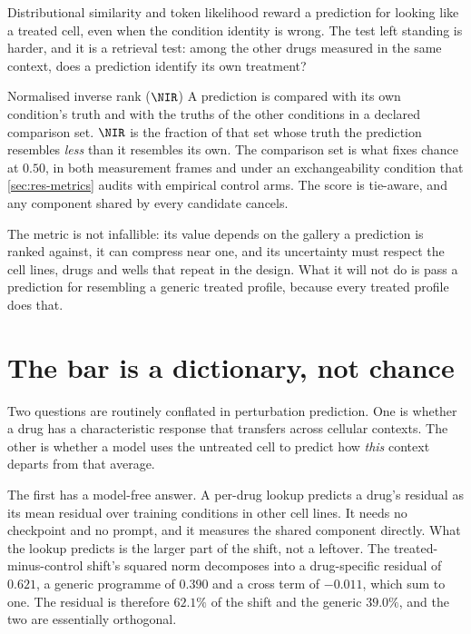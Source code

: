 Distributional similarity and token likelihood reward a prediction for looking
like a treated cell, even when the condition identity is wrong. The test left
standing is harder, and it is a retrieval test: among the other drugs measured
in the same context, does a prediction identify its own treatment?

\begin{defn}{Normalised inverse rank ($\NIR$)}
A prediction is compared with its own condition's truth and with the truths of
the other conditions in a declared comparison set. $\NIR$ is the fraction of that
set whose truth the prediction resembles \emph{less} than it resembles its own.
The comparison set is what fixes chance at $0.50$, in both measurement frames and
under an exchangeability condition that \cref{sec:res-metrics} audits with
empirical control arms. The score is tie-aware, and any component shared by every
candidate cancels.
\end{defn}

The metric is not infallible: its value depends on the gallery a prediction is
ranked against, it can compress near one, and its uncertainty must respect the
cell lines, drugs and wells that repeat in the design. What it will not do is
pass a prediction for resembling a generic treated profile, because every
treated profile does that.

\section{The bar is a dictionary, not chance}
\label{sec:intro-bar}

Two questions are routinely conflated in perturbation prediction. One is whether
a drug has a characteristic response that transfers across cellular contexts.
The other is whether a model uses the untreated cell to predict how \emph{this}
context departs from that average.

The first has a model-free answer. A per-drug lookup predicts a
drug's residual as its mean residual over training conditions in other cell
lines. It needs no checkpoint and no prompt, and it measures the shared
component directly. What the lookup predicts is the larger part of the shift, not a leftover. The
treated-minus-control shift's squared norm decomposes into a drug-specific
residual of $0.621$, a generic programme of $0.390$ and a cross term of
$-0.011$, which sum to one. The residual is therefore $62.1\%$ of the shift and
the generic $39.0\%$, and the two are essentially orthogonal.

